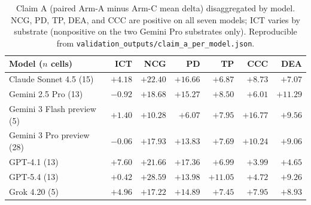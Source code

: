 \documentclass[11pt]{article}
\begin{document}
\begin{table}[h]
\caption{Claim A (paired Arm-A minus Arm-C mean delta) disaggregated by model. NCG, PD, TP, DEA, and CCC are positive on all seven models; ICT varies by substrate (nonpositive on the two Gemini Pro substrates only). Reproducible from \texttt{validation\_outputs/claim\_a\_per\_model.json}.}
\label{tab:claim-a-per-model}
\centering
\small
\begin{tabular}{lrrrrrr}
\toprule
Model ($n$ cells) & ICT & NCG & PD & TP & CCC & DEA \\
\midrule
Claude Sonnet 4.5 (15)     & $+4.18$ & $+22.40$ & $+16.66$ & $+6.87$  & $+8.73$  & $+7.07$ \\
Gemini 2.5 Pro (13)        & $-0.92$ & $+18.68$ & $+15.27$ & $+8.50$  & $+6.01$  & $+11.29$ \\
Gemini 3 Flash preview (5) & $+1.40$ & $+10.28$ & $+6.07$  & $+7.95$  & $+16.77$ & $+9.56$ \\
Gemini 3 Pro preview (28)  & $-0.06$ & $+17.93$ & $+13.83$ & $+7.69$  & $+10.24$ & $+9.06$ \\
GPT-4.1 (13)               & $+7.60$ & $+21.66$ & $+17.36$ & $+6.99$  & $+3.99$  & $+4.65$ \\
GPT-5.4 (13)               & $+0.42$ & $+28.59$ & $+13.98$ & $+11.05$ & $+4.72$  & $+9.26$ \\
Grok 4.20 (5)              & $+4.96$ & $+17.22$ & $+14.89$ & $+7.45$  & $+7.95$  & $+8.93$ \\
\bottomrule
\end{tabular}
\end{table}
\end{document}
